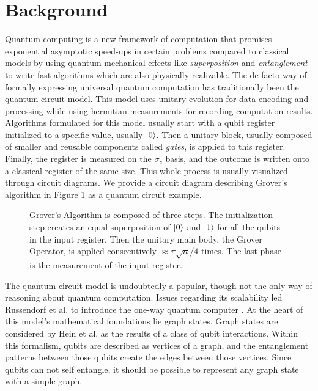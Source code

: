 \section{Background}

Quantum computing is a new framework of computation that promises exponential asymptotic speed-ups in certain problems compared to classical models by using quantum mechanical effects like \emph{superposition} and \emph{entanglement} to write fast algorithms which are also physically realizable. The de facto way of formally expressing universal quantum computation has traditionally been the quantum circuit model\cite{Nielsen2009}. This model uses unitary evolution for data encoding and processing while using hermitian measurements for recording computation results. Algorithms formulated for this model usually start with a qubit register initialized to a specific value, usually \(\lvert0\rangle\). Then a unitary block, usually composed of smaller and reusable components called \emph{gates}, is applied to this register. Finally, the register is measured on the \(\sigma_z\) basis, and the outcome is written onto a classical register of the same size. This whole process is usually visualized through circuit diagrams. We provide a circuit diagram describing Grover's algorithm in Figure \ref{fig:grover} as a quantum circuit example.

\begin{figure}[htb]
  \centering
  
  \caption{Grover's Algorithm is composed of three steps. The initialization step creates an equal superposition of \(\lvert0\rangle\) and \(\lvert1\rangle\) for all the qubits in the input register. Then the unitary main body, the Grover Operator, is applied consecutively \(\approx\pi\sqrt{n}/4\) times. The last phase is the measurement of the input register.}\label{fig:grover}
\end{figure}

The quantum circuit model is undoubtedly a popular, though not the only way of reasoning about quantum computation. Issues regarding its scalability led Russendorf et al. to introduce the one-way quantum computer \cite{russendorf2001, russendorf2003}. At the heart of this model's mathematical foundations lie graph states. Graph states are considered by Hein et al. as the results of a class of qubit interactions\cite{hein2006}. Within this formalism, qubits are described as vertices of a graph, and the entanglement patterns between those qubits create the edges between those vertices. Since qubits can not self entangle, it should be possible to represent any graph state with a simple graph. 

